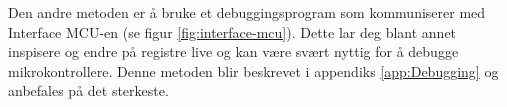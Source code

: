 \begin{alphasection}
Den andre metoden er å bruke et debuggingsprogram som kommuniserer med Interface MCU-en (se figur \ref{fig:interface-mcu}). Dette lar deg blant annet inspisere og endre på registre live og kan være svært nyttig for å debugge mikrokontrollere. Denne metoden blir beskrevet i appendiks \ref{app:Debugging} og anbefales på det sterkeste.


\end{alphasection}



\setcounter{section}{0}
